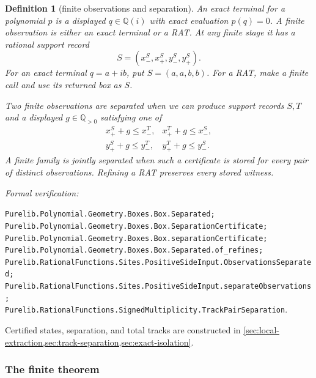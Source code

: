 \documentclass[11pt]{article}
\newtheorem{definition}[theorem]{Definition}
\newcommand{\Qi}{\mathbb{Q}(i)}
\newcommand{\Q}{\mathbb{Q}}
\newcommand{\leanref}[1]{\par\smallskip\noindent
  \emph{Formal verification:}\par\nobreak
  {\raggedright\nolinkurl{#1}.\par}}
\begin{document}
\begin{definition}[finite observations and separation]
\label{def:finite-observation-separation}
An \emph{exact terminal} for a polynomial $p$ is a displayed $q\in\Qi$
with exact evaluation $p(q)=0$.  A \emph{finite observation}
is either an exact terminal or a RAT.  At any finite stage it has a rational
\emph{support record}
\[
                   S=(x_-^S,x_+^S,y_-^S,y_+^S).
\]
For an exact terminal $q=a+ib$, put $S=(a,a,b,b)$.  For a RAT, make a
finite call and use its returned box as $S$.

Two finite observations are \emph{separated} when we can produce support
records $S,T$ and a displayed $g\in\Q_{>0}$ satisfying one of
\[
\begin{array}{ll}
 x_+^S+g\le x_-^T, & x_+^T+g\le x_-^S,\\[2pt]
 y_+^S+g\le y_-^T, & y_+^T+g\le y_-^S.
\end{array}
\]
A finite family is \emph{jointly separated} when such a certificate is
stored for every pair of distinct observations.  Refining a RAT preserves
every stored witness.
\end{definition}

\leanref{Purelib.Polynomial.Geometry.Boxes.Box.Separated;
Purelib.Polynomial.Geometry.Boxes.Box.SeparationCertificate;
Purelib.Polynomial.Geometry.Boxes.Box.separationCertificate;
Purelib.Polynomial.Geometry.Boxes.Box.Separated.of_refines;
Purelib.RationalFunctions.Sites.PositiveSideInput.ObservationsSeparated;
Purelib.RationalFunctions.Sites.PositiveSideInput.separateObservations;
Purelib.RationalFunctions.SignedMultiplicity.TrackPairSeparation}

Certified states, separation, and total tracks are constructed in
\cref{sec:local-extraction,sec:track-separation,sec:exact-isolation}.

\subsubsection{The finite theorem}
\end{document}
